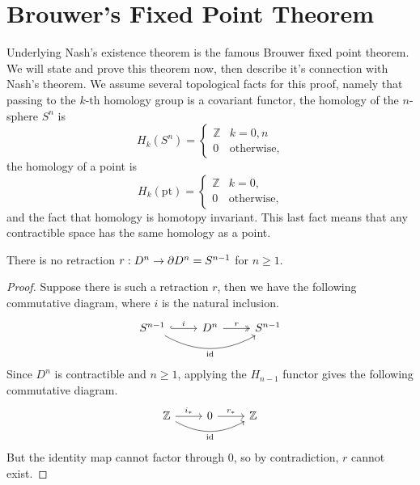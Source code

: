 \documentclass[twoside,10pt]{article}
\begin{document}
\section{Brouwer's Fixed Point Theorem}

Underlying Nash's existence theorem is the famous Brouwer fixed point theorem. We will state and prove this theorem now, then describe it's connection with Nash's theorem. We assume several topological facts for this proof, namely that passing to the $k$-th homology group is a covariant functor, the homology of the $n$-sphere $S^{n}$ is
\[
	H_{k}(S^{n}) =
	\begin{cases}
		\mathbb{Z} & k=0,n \\
		0 & \text{otherwise},
	\end{cases}
\] 
the homology of a point is
\[
	H_{k}(\text{pt}) =
	\begin{cases}
		\mathbb{Z} & k=0,\\
		0 & \text{otherwise},
	\end{cases}
\] and the fact that homology is homotopy invariant. This last fact means that any contractible space has the same homology as a point.

\begin{lem}
	\label{no-retraction}
There is no retraction $r:D^{n}\to \partial D^{n} = S^{n-1}$ for $n \geq 1$.
\end{lem}
\begin{proof}
	Suppose there is such a retraction $r$, then we have the following commutative diagram, where $i$ is the natural inclusion.
	\[
		\begin{tikzcd}
			S^{n-1} \rar[hook]{i} \arrow[rr, bend right, "\id"'] & D^{n} \rar[two heads]{r} & S^{n-1}
		\end{tikzcd}
	\] 
	Since $D^{n}$ is contractible and $n \geq 1$, applying the $H_{n-1}$ functor gives the following commutative diagram.
	\[
		\begin{tikzcd}
			\mathbb{Z} \rar{i_{*}} \arrow[rr, bend right, "\id"'] & 0 \rar{r_{*}} & \mathbb{Z}
		\end{tikzcd}
	\] 
	But the identity map cannot factor through 0, so by contradiction, $r$ cannot exist.
\end{proof}
\end{document}
